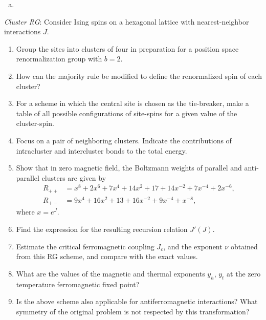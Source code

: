 \begin{solution}
    \begin{enumerate}[(a)]
        \item
    \end{enumerate}
\end{solution}

\begin{problem}
    \textit{Cluster RG}: Consider Ising spins on a hexagonal lattice with nearest-neighbor interactions $J$.

    \begin{enumerate}
        \item[(a)] Group the sites into clusters of four in preparation for a position space renormalization group with $b = 2$.

        \item[(b)] How can the majority rule be modified to define the renormalized spin of each cluster?

        \item[(c)] For a scheme in which the central site is chosen as the tie-breaker, make a table of all possible configurations of site-spins for a given value of the cluster-spin.

        \item[(d)] Focus on a pair of neighboring clusters. Indicate the contributions of intracluster and intercluster bonds to the total energy.

        \item[(e)] Show that in zero magnetic field, the Boltzmann weights of parallel and anti-parallel clusters are given by
        \begin{align*}
            R_{++} &= x^8 + 2x^6 + 7x^4 + 14x^2 + 17 + 14x^{-2} + 7x^{-4} + 2x^{-6}, \\
            R_{+-} &= 9x^4 + 16x^2 + 13 + 16x^{-2} + 9x^{-4} + x^{-8},
        \end{align*}
        where $x = e^J$.

        \item[(f)] Find the expression for the resulting recursion relation $J'(J)$.

        \item[(g)] Estimate the critical ferromagnetic coupling $J_c$, and the exponent $\nu$ obtained from this RG scheme, and compare with the exact values.

        \item[(h)] What are the values of the magnetic and thermal exponents $y_h$, $y_t$ at the zero temperature ferromagnetic fixed point?

        \item[(i)] Is the above scheme also applicable for antiferromagnetic interactions? What symmetry of the original problem is not respected by this transformation?
    \end{enumerate}
\end{problem}

